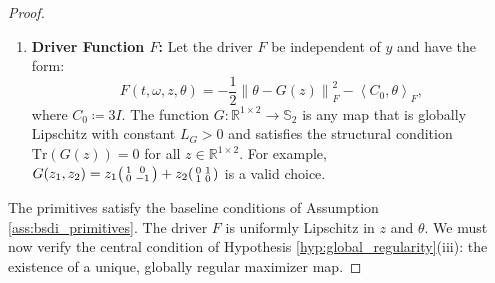 \documentclass[12pt, letterpaper]{amsart}
\newcommand{\R}{\mathbb{R}}
\newcommand{\norm}[1]{\left\lVert#1\right\rVert}
\newcommand{\scpr}[2]{\left\langle #1, #2 \right\rangle}
\newcommand{\Tr}{\mathrm{Tr}}
\theoremstyle{plain}
\theoremstyle{definition}
\theoremstyle{remark}
\numberwithin{equation}{section} %
\begin{document}
\begin{appendices}
\begin{proof}
\begin{enumerate}[label=(\alph*)]
    \item \textbf{Driver Function \(F\):} Let the driver \(F\) be independent of \(y\) and have the form:
    \[
        F(t, \omega, z, \theta) = -\frac{1}{2} \norm{\theta - G(z)}_F^2 - \scpr{C_0}{\theta}_F,
    \]
    where \(C_0 \coloneqq 3I\). The function \(G: \R^{1\times 2} \to \mathbb{S}_2\) is any map that is globally Lipschitz with constant \(L_G > 0\) and satisfies the structural condition \(\Tr(G(z)) = 0\) for all \(z \in \R^{1\times 2}\). For example, \(G(z_1, z_2) = z_1 \begin{psmallmatrix} 1 & 0 \\ 0 & -1 \end{psmallmatrix} + z_2 \begin{psmallmatrix} 0 & 1 \\ 1 & 0 \end{psmallmatrix}\) is a valid choice.
\end{enumerate}
The primitives satisfy the baseline conditions of Assumption \ref{ass:bsdi_primitives}. The driver \(F\) is uniformly Lipschitz in \(z\) and \(\theta\). We must now verify the central condition of Hypothesis \ref{hyp:global_regularity}(iii): the existence of a unique, globally regular maximizer map.


\end{proof}
\end{appendices}
\end{document}
